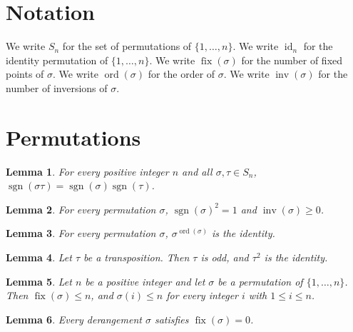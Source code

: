 \documentclass{article}
\newtheorem{lemma}{Lemma}
\begin{document}
\section{Notation}

We write $S_n$ for the set of permutations of $\{1,\dots,n\}$.
We write $\operatorname{id}_n$ for the identity permutation of $\{1,\dots,n\}$.
We write $\operatorname{fix}(\sigma)$ for the number of fixed points of $\sigma$.
We write $\operatorname{ord}(\sigma)$ for the order of $\sigma$.
We write $\operatorname{inv}(\sigma)$ for the number of inversions of $\sigma$.

\section{Permutations}

\begin{lemma}\label{sign}
For every positive integer $n$ and all $\sigma,\tau\in S_n$, $\operatorname{sgn}(\sigma\tau)=\operatorname{sgn}(\sigma)\operatorname{sgn}(\tau)$.
\end{lemma}

\begin{lemma}\label{inversions}
For every permutation $\sigma$, $\operatorname{sgn}(\sigma)^2=1$ and $\operatorname{inv}(\sigma)\ge0$.
\end{lemma}

\begin{lemma}\label{order}
For every permutation $\sigma$, $\sigma^{\operatorname{ord}(\sigma)}$ is the identity.
\end{lemma}

\begin{lemma}\label{transposition}
Let $\tau$ be a transposition. Then $\tau$ is odd, and $\tau^2$ is the identity.
\end{lemma}

\begin{lemma}\label{fixed}
Let $n$ be a positive integer and let $\sigma$ be a permutation of $\{1,\dots,n\}$. Then $\operatorname{fix}(\sigma)\le n$, and $\sigma(i)\le n$ for every integer $i$ with $1\le i\le n$.
\end{lemma}

\begin{lemma}\label{derangement}
Every derangement $\sigma$ satisfies $\operatorname{fix}(\sigma)=0$.
\end{lemma}
\end{document}

